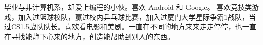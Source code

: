 
毕业与非计算机系，却爱上编程的小伙。喜欢 Android 和 Google。 喜欢竞技类游戏，加入过篮球校队，赢过校内乒乓球比赛，加入过厦门大学星际争霸1战队，当过CS1.5战队队长。喜欢看电影和美剧。一直在不同的地方来来走走停停，也一直在寻找能静下心来的地方，创造能帮助到别人的东西。

